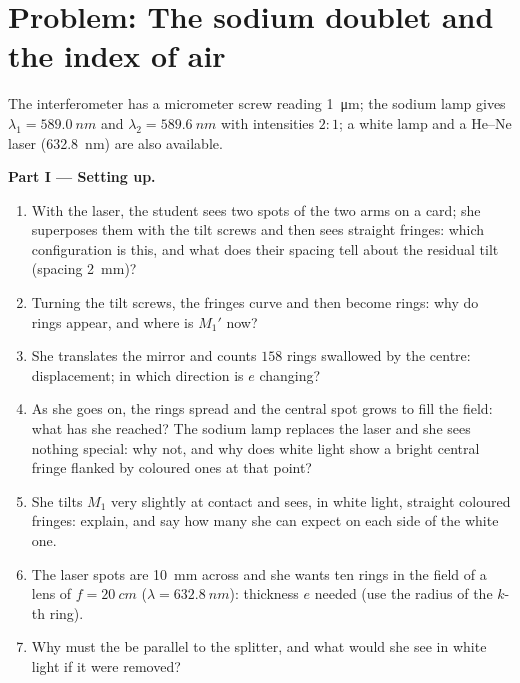 \section{Problem: The sodium doublet and the index of air}

\begin{problem}
\label{pb:b2:michelson:1}

The interferometer has a micrometer screw reading \qty{1}{\micro m}; the
sodium lamp gives $\lambda_1 = \qty{589.0}{nm}$ and $\lambda_2 = \qty{589.6}{nm}$ with
intensities $2 : 1$; a white lamp and a He--Ne laser (\qty{632.8}{nm}) are
also available.

\medskip
\noindent\textbf{Part I --- Setting up.}
\begin{enumerate}
  \item With the laser, the student sees two spots of the two arms on
        a card; she superposes them with the tilt screws and then sees
        straight fringes: which configuration is this, and what does
        their spacing tell about the residual tilt (spacing \qty{2}{mm})?
  \item Turning the tilt screws, the fringes curve and then become
        rings: why do rings appear, and where is $M_1'$ now?
  \item She translates the mirror and counts $158$ rings swallowed by
        the centre: displacement; in which direction is $e$ changing?
  \item As she goes on, the rings spread and the central spot grows
        to fill the field: what has she reached? The sodium lamp
        replaces the laser and she sees nothing special: why not, and
        why does white light show a bright central fringe flanked by
        coloured ones at that point?
  \item She tilts $M_1$ very slightly at contact and sees, in white
        light, straight coloured fringes: explain, and say how many
        she can expect on each side of the white one.
  \item The laser spots are \qty{10}{mm} across and she wants ten rings
        in the field of a lens of $f = \qty{20}{cm}$ ($\lambda = \qty{632.8}{nm}$):
        thickness $e$ needed (use the radius of the $k$-th ring).
  \item Why must the  be parallel to the splitter,
        and what would she see in white light if it were removed?
\end{enumerate}


\end{problem}
